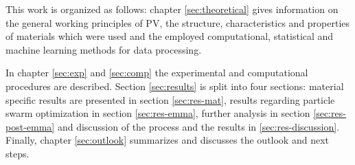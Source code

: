 This work is organized as follows: chapter 
\ref{sec:theoretical} gives 
information on the general working principles of PV, the structure, characteristics and properties of materials which were used and the employed computational, statistical and machine learning methods for data processing. 

In chapter \ref{sec:exp} and \ref{sec:comp} the experimental and computational procedures are described. 
Section \ref{sec:results} is split into four sections: material specific results are presented in section \ref{sec:res-mat}, results regarding particle swarm optimization in section \ref{sec:res-emma}, further analysis in section \ref{sec:res-post-emma} and discussion of the process and the results in \ref{sec:res-discussion}.
Finally, chapter \ref{sec:outlook} summarizes and discusses the outlook and next steps.

